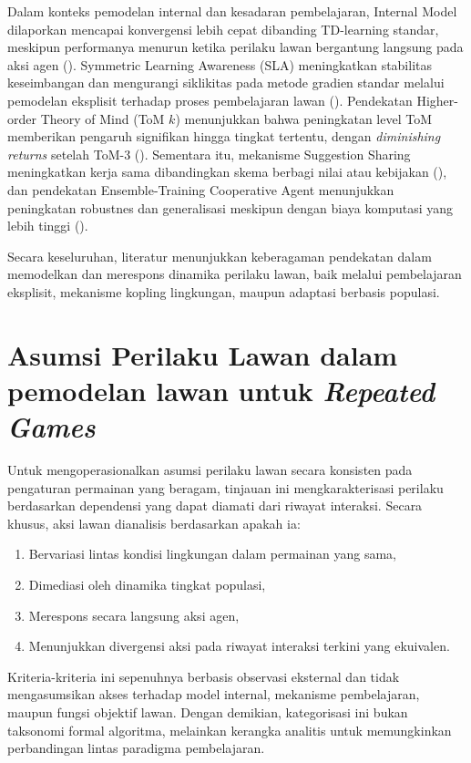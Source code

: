Dalam konteks pemodelan internal dan kesadaran pembelajaran, Internal Model dilaporkan mencapai konvergensi lebih cepat dibanding TD-learning standar, meskipun performanya menurun ketika perilaku lawan bergantung langsung pada aksi agen (\cite{freire_modeling_2023}). Symmetric Learning Awareness (SLA) meningkatkan stabilitas keseimbangan dan mengurangi siklikitas pada metode gradien standar melalui pemodelan eksplisit terhadap proses pembelajaran lawan (\cite{hu_modeling_2023}). Pendekatan Higher-order Theory of Mind (ToM $k$) menunjukkan bahwa peningkatan level ToM memberikan pengaruh signifikan hingga tingkat tertentu, dengan \textit{diminishing returns} setelah ToM-3 (\cite{de_weerd_higher-order_2022}). Sementara itu, mekanisme Suggestion Sharing meningkatkan kerja sama dibandingkan skema berbagi nilai atau kebijakan (\cite{jin_achieving_2025}), dan pendekatan Ensemble-Training Cooperative Agent menunjukkan peningkatan robustnes dan generalisasi meskipun dengan biaya komputasi yang lebih tinggi (\cite{perera_learning_2025}).

Secara keseluruhan, literatur menunjukkan keberagaman pendekatan dalam memodelkan dan merespons dinamika perilaku lawan, baik melalui pembelajaran eksplisit, mekanisme kopling lingkungan, maupun adaptasi berbasis populasi. 

\section{Asumsi Perilaku Lawan dalam pemodelan lawan untuk \textit{Repeated Games}}

Untuk mengoperasionalkan asumsi perilaku lawan secara konsisten pada 
pengaturan permainan yang beragam, tinjauan ini mengkarakterisasi perilaku 
berdasarkan dependensi yang dapat diamati dari riwayat interaksi. 
Secara khusus, aksi lawan dianalisis berdasarkan apakah ia:

\begin{enumerate}
    \item Bervariasi lintas kondisi lingkungan dalam permainan yang sama,
    \item Dimediasi oleh dinamika tingkat populasi,
    \item Merespons secara langsung aksi agen,
    \item Menunjukkan divergensi aksi pada riwayat interaksi terkini yang ekuivalen.
\end{enumerate}

Kriteria-kriteria ini sepenuhnya berbasis observasi eksternal dan tidak 
mengasumsikan akses terhadap model internal, mekanisme pembelajaran, 
maupun fungsi objektif lawan. Dengan demikian, kategorisasi ini bukan 
taksonomi formal algoritma, melainkan kerangka analitis untuk memungkinkan 
perbandingan lintas paradigma pembelajaran.

